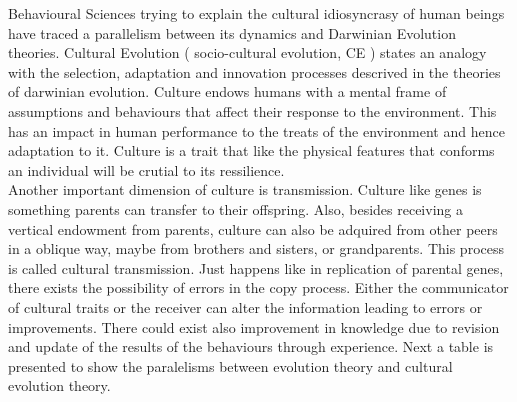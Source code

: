 \documentclass[11pt,oneside,a4paper,openright]{report}
\begin{document}
Behavioural Sciences trying to explain the cultural idiosyncrasy of human beings have traced a parallelism between its dynamics and Darwinian Evolution theories. Cultural Evolution \cite[ch11.]{Dawkins1990}\cite{Stanford_CultEvol}( socio-cultural evolution, CE ) states an analogy with the selection, adaptation and innovation processes descrived in the theories of darwinian evolution. Culture endows humans with a mental frame of assumptions and behaviours that affect their response to the environment. This has an impact in human performance to the treats of the environment and hence adaptation to it. Culture is a trait that like the physical features that conforms an individual will be crutial to its ressilience.\\ 
Another important dimension of culture is transmission. Culture like genes is something parents can transfer to their offspring. Also, besides receiving a vertical endowment from parents, culture can also be adquired from other peers in a oblique way, maybe from brothers and sisters, or grandparents. This process is called cultural transmission. Just happens like in replication of parental genes, there exists the possibility of errors in the copy process. Either the communicator of cultural traits or the receiver can alter the information leading to errors or improvements. There could exist also improvement in knowledge due to revision and update of the results of the behaviours through experience. Next a table is presented to show the paralelisms between evolution theory and cultural evolution theory.
\end{document}
